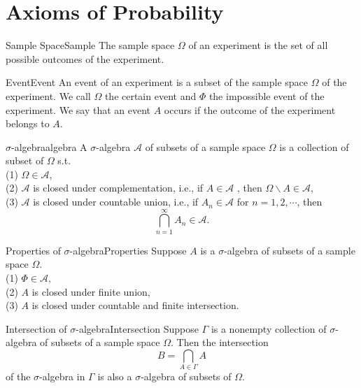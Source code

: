 \documentclass{elegantbook}
\author{杨敬轩}
\date{\today}
\newcommand\ma{\mathcal{A}}
\begin{document}
\maketitle
\tableofcontents
\mainmatter
\chapter{Axioms of Probability}

\begin{definition}{Sample Space}{Sample}
The sample space $\Omega$ of an experiment is the set of all possible outcomes of the experiment.
\end{definition}

\begin{definition}{Event}{Event}
An event of an experiment is a subset of the sample space $\Omega$ of the experiment. 
We call $\Omega$ the certain event and $\Phi$ the impossible event of the experiment. 
We say that an event $A$ occurs if the outcome of the experiment belongs to $A$.

\end{definition}

\begin{definition}{$\sigma$-algebra}{algebra}
A $\sigma$-algebra $\ma$ of subsets of a sample space $\Omega$ is a collection of subset of $\Omega$ s.t.\\
(1) $\Omega\in\ma$,\\
(2) $\ma$  is closed under complementation, i.e., if $A\in\ma$ , then $\Omega\backslash A\in\ma$,\\
(3) $\ma$  is closed under countable union, i.e., if $A_n\in\ma$ for $n=1,2,\cdots$, then $$\bigcap_{n=1}^\infty A_n \in\ma.$$

\end{definition}

\begin{theorem}{Properties of $\sigma$-algebra}{Properties}
Suppose $A$ is a $\sigma$-algebra of subsets of a sample space $\Omega$.
\\
(1) $\Phi\in\ma,$\\
(2) $A$ is closed under finite union,\\
(3) $A$ is closed under countable and finite intersection.

\end{theorem}

\begin{theorem}{Intersection of $\sigma$-algebra}{Intersection}
Suppose $\Gamma$ is a nonempty collection of $\sigma$-algebra of subsets of a sample space $\Omega$. Then the intersection $$B=\bigcap_{A\in\Gamma}A$$ of the $\sigma$-algebra in $\Gamma$ is also a $\sigma$-algebra of subsets of $\Omega$.

\end{theorem}
\end{document}
